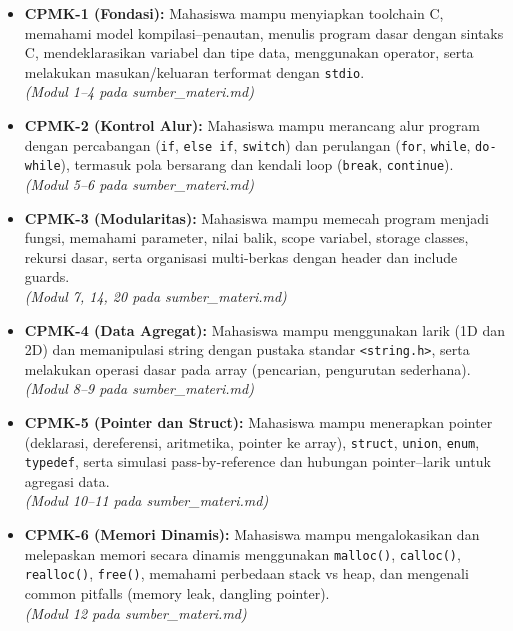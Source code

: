 \documentclass[12pt,a4paper]{article}
\begin{document}
\begin{itemize}[leftmargin=*]
  \item \textbf{CPMK-1 (Fondasi):} Mahasiswa mampu menyiapkan toolchain C, memahami model kompilasi--penautan, menulis program dasar dengan sintaks C, mendeklarasikan variabel dan tipe data, menggunakan operator, serta melakukan masukan/keluaran terformat dengan \texttt{stdio}.\\
  \textit{(Modul 1--4 pada sumber\_materi.md)}

  \item \textbf{CPMK-2 (Kontrol Alur):} Mahasiswa mampu merancang alur program dengan percabangan (\texttt{if}, \texttt{else if}, \texttt{switch}) dan perulangan (\texttt{for}, \texttt{while}, \texttt{do-while}), termasuk pola bersarang dan kendali loop (\texttt{break}, \texttt{continue}).\\
  \textit{(Modul 5--6 pada sumber\_materi.md)}

  \item \textbf{CPMK-3 (Modularitas):} Mahasiswa mampu memecah program menjadi fungsi, memahami parameter, nilai balik, scope variabel, storage classes, rekursi dasar, serta organisasi multi-berkas dengan header dan include guards.\\
  \textit{(Modul 7, 14, 20 pada sumber\_materi.md)}

  \item \textbf{CPMK-4 (Data Agregat):} Mahasiswa mampu menggunakan larik (1D dan 2D) dan memanipulasi string dengan pustaka standar \texttt{<string.h>}, serta melakukan operasi dasar pada array (pencarian, pengurutan sederhana).\\
  \textit{(Modul 8--9 pada sumber\_materi.md)}

  \item \textbf{CPMK-5 (Pointer dan Struct):} Mahasiswa mampu menerapkan pointer (deklarasi, dereferensi, aritmetika, pointer ke array), \texttt{struct}, \texttt{union}, \texttt{enum}, \texttt{typedef}, serta simulasi pass-by-reference dan hubungan pointer--larik untuk agregasi data.\\
  \textit{(Modul 10--11 pada sumber\_materi.md)}

  \item \textbf{CPMK-6 (Memori Dinamis):} Mahasiswa mampu mengalokasikan dan melepaskan memori secara dinamis menggunakan \texttt{malloc()}, \texttt{calloc()}, \texttt{realloc()}, \texttt{free()}, memahami perbedaan stack vs heap, dan mengenali common pitfalls (memory leak, dangling pointer).\\
  \textit{(Modul 12 pada sumber\_materi.md)}


\end{itemize}
\end{document}
